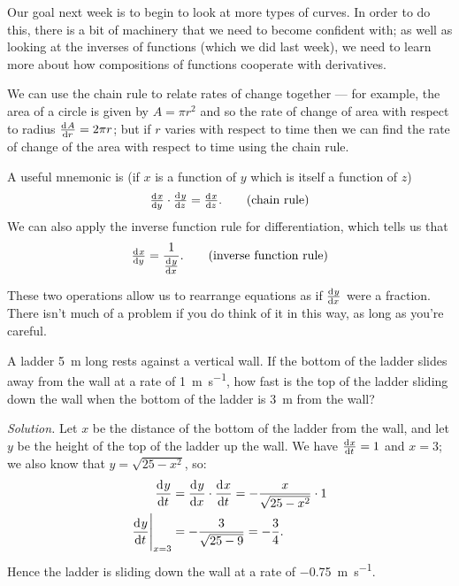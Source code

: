 


Our goal next week is to begin to look at more types of curves. In order to do this, there is a bit of machinery that we need
to become confident with; as well as looking at the inverses of functions (which we did last week), we need to learn more about
how compositions of functions cooperate with derivatives.

We can use the chain rule to relate rates of change together --- for example, the area of a circle is given by $ A = \pi r^2 $
and so the rate of change of area with respect to radius $ \od{A}{r} = 2\pi r $; but if $ r $ varies with respect to time then
we can find the rate of change of the area with respect to time using the chain rule.

A useful mnemonic is (if $ x $ is a function of $ y $ which is itself a function of $ z $)
\begin{equation}
  \od{x}{y} \cdot \od{y}{z} = \od{x}{z}. \tag{chain rule}
\end{equation}
We can also apply the inverse function rule for differentiation, which tells us that
\begin{equation}
  \od{x}{y} = \frac{1}{\od{y}{x}}. \tag{inverse function rule}
\end{equation}

These two operations allow us to rearrange equations as if $ \od{y}{x} $ were a fraction. There isn't much of a problem
if you do think of it in this way, as long as you're careful.

\begin{ex}
  A ladder \SI{5}{\metre} long rests against a vertical wall. If the bottom of the ladder slides away
  from the wall at a rate of \SI{1}{\metre\per\second}, how fast is the top of the ladder sliding down the
  wall when the bottom of the ladder is \SI{3}{\metre} from the wall?

  \textit{Solution.} Let $ x $ be the distance of the bottom of the ladder from the wall, and let $ y $
  be the height of the top of the ladder up the wall. We have $ \od{x}{t} = 1 $ and $ x = 3 $; we also
  know that $ y = \sqrt{25 - x^2} $, so:
  \begin{align*}
    \dod{y}{t} &= \dod{y}{x} \cdot \dod{x}{t} = -\frac{x}{\sqrt{25 - x^2}} \cdot 1\\
    \eval{\dod{y}{t}}_{x = 3} &= -\frac{3}{\sqrt{25 - 9}} = -\frac{3}{4}.
  \end{align*}
  Hence the ladder is sliding down the wall at a rate of \SI{-0.75}{\metre\per\second}.
\end{ex}

